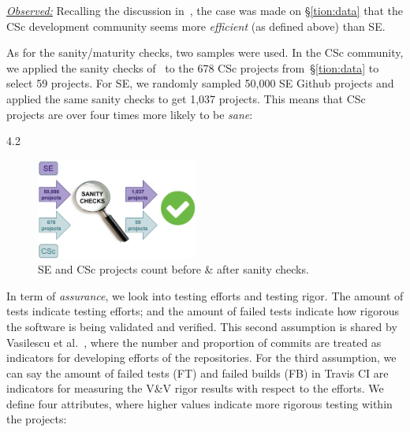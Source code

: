 \documentclass[conference,10pt]{IEEEtran}
\begin{document}
\noindent \textit{\underline{Observed:}}
Recalling the discussion in~, the case was made on \S\ref{tion:data} that the CSc development community seems more {\em efficient} (as defined above) than SE.

As for the sanity/maturity checks, two samples were used. In the CSc community, we applied the sanity checks
of~ to the 678 CSc projects from~\S\ref{tion:data} to select 59 projects. For SE, we randomly sampled 50,000 SE Github projects and applied the same sanity checks to get 1,037 projects. 
This means that CSc projects are over four times more likely to be {\em sane}:
\vspace{2pt}

\centerline{  4.2 }

\vspace{2pt}

\begin{figure}
\vspace{-3pt}
  \centering
  \includegraphics[width=0.8\linewidth, height=1.3in]{img/sanity_check.png} 
  \vspace{-7pt}
  \caption{SE and CSc projects count before \& after sanity checks.}
  \label{fig:sanity}
  \vspace{-15pt}
\end{figure}

In term of {\em assurance}, we look into testing efforts and testing rigor. The amount of tests indicate testing efforts; and the amount of failed tests indicate how rigorous the software is being validated and verified. This second assumption is shared by Vasilescu et al.~\cite{vasilescu16_limit, xia2019sequential}, where the number and proportion of commits are treated as indicators for developing efforts of the repositories. For the third assumption, we can say the amount of failed tests (FT) and failed builds (FB) in Travis CI are indicators for measuring the V\&V rigor results with respect to the efforts. We define four attributes, where higher values indicate more rigorous testing within the projects:
\end{document}
